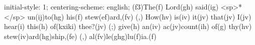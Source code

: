 initial-style: 1;
centering-scheme: english;
(f3)The(f) Lord(gh) said(ig) <sp>*</sp> un(ij)to(hg) his(f) stew(ef)ard,(fv) (,) How(hv) is(iv) it(jv) that(jv) I(jv) hear(i) this(h) of(kxiki) thee?(jv) (;) give(h) an(iv) ac(jv)count(ih) of(g) thy(hv) stew(iv)ard(hg)ship,(fe) (,) al(fv)le(ghg)lu(f)ia.(f)
